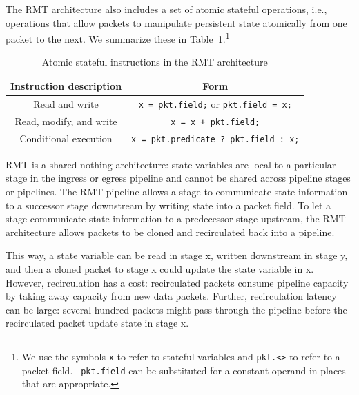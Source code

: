 The RMT architecture also includes a set of atomic stateful operations, i.e.,
operations that allow packets to manipulate persistent state atomically from
one packet to the next.  We summarize these in
Table~\ref{t:stateful_inst}.\footnote{We use the symbols {\tt x} to refer to
stateful variables and {\tt pkt.<>} to refer to a packet field. {\tt
pkt.field} can be substituted for a constant operand in places that are
appropriate.}
\begin{table}
\begin{small}
\begin{tabular}{|c|c|}
\hline
Instruction description & Form \\
\hline
Read and write & \texttt{x = pkt.field;} or \texttt{pkt.field = x;} \\
\hline
Read, modify, and write & \texttt{x = x + pkt.field;} \\
\hline
Conditional execution & \texttt{x = pkt.predicate ? pkt.field : x;} \\
\hline
\end{tabular}
\end{small}
\caption{Atomic stateful instructions in the RMT architecture}
\label{t:stateful_inst}
\end{table}

RMT is a shared-nothing architecture: state variables are local to a particular
stage in the ingress or egress pipeline and cannot be shared across pipeline
stages or pipelines. The RMT pipeline allows a stage to communicate state
information to a successor stage downstream by writing state into a packet
field. To let a stage communicate state information to a predecessor stage
upstream, the RMT architecture allows packets to be cloned and recirculated
back into a pipeline.

This way, a state variable can be read in stage x, written downstream in stage
y, and then a cloned packet to stage x could update the state variable in x.
However, recirculation has a cost: recirculated packets consume pipeline
capacity by taking away capacity from new data packets. Further, recirculation
latency can be large: several hundred packets might pass through the pipeline
before the recirculated packet update state in stage x.
